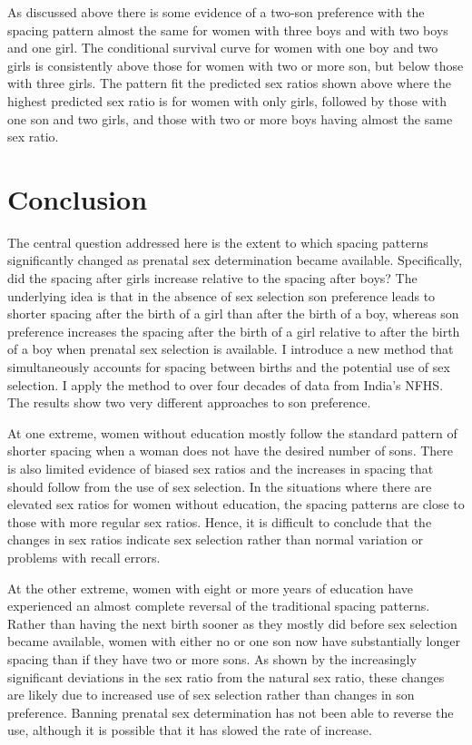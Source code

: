 \documentclass[12pt,letterpaper]{article}
\begin{document}
As discussed above there is some evidence of a two-son preference with
the spacing pattern almost the same for women with three boys and with
two boys and one girl.
The conditional survival curve for women with one boy and two girls is
consistently above those for women with two or more son, but below those 
with three girls.
The pattern fit the predicted sex ratios shown above where the highest
predicted sex ratio is for women with only girls, followed by those
with one son and two girls, and those with two or more boys having
almost the same sex ratio.

\FloatBarrier
\section{Conclusion\label{sec:conclusion}}


The central question addressed here is the extent to which spacing patterns 
significantly changed as prenatal sex determination became available.
Specifically, did the spacing after girls increase relative to the spacing
after boys?
The underlying idea is that in the absence of sex selection son 
preference leads to shorter spacing after the birth of a girl than after the 
birth of a boy, whereas son preference increases the spacing after the birth 
of a girl relative to after the birth of a boy when prenatal sex selection is 
available.
I introduce a new method that simultaneously accounts for spacing
between births and the potential use of sex selection. 
I apply the method to over four decades of data from India's NFHS.
The results show two very different approaches to son preference.

At one extreme, women without education mostly follow the standard 
pattern of shorter spacing when a woman does not have the desired number of 
sons.
There is also limited evidence of biased sex ratios and the increases in
spacing that should follow from the use of sex selection.
 In the situations where there are elevated sex ratios for women without
education, the spacing patterns are close to those with more regular sex
ratios. 
Hence, it is difficult to conclude that the changes in sex
ratios indicate sex selection rather than normal variation or problems
with recall errors.

At the other extreme, women with eight or more years of education have
experienced an almost complete reversal of the traditional spacing patterns.
Rather than having the next birth sooner as they mostly did before 
sex selection became available, women with either no or one son now 
have substantially longer spacing than if they have two or more sons.
As shown by the increasingly significant deviations in the sex ratio
from the natural sex ratio, these changes are likely due to increased
use of sex selection rather than changes in son preference. 
Banning prenatal sex determination has not been able to
reverse the use, although it is possible that it has slowed the rate 
of increase.
\end{document}
